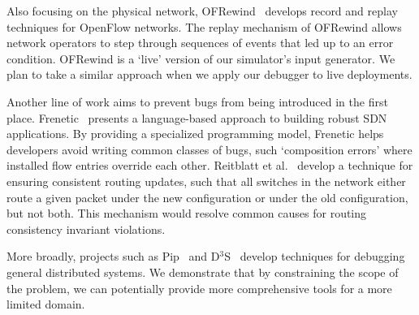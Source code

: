 
Also focusing on the physical network, OFRewind~\cite{ofrewind} develops
record and replay techniques
for OpenFlow networks. The replay
mechanism of OFRewind allows network operators to step through sequences of
events that led up to an error condition. OFRewind is a `live' version of our
simulator's input generator. We plan to take a similar approach when we apply
our debugger to live deployments. 

Another line of work aims to prevent bugs from being introduced in the first
place. Frenetic~\cite{frenetic} presents a language-based approach to building
robust SDN applications. By providing a specialized programming model, Frenetic helps developers avoid writing common classes of
bugs, such `composition errors' where installed flow entries override each other.
Reitblatt et al.~\cite{consistentupdates} develop a technique for ensuring
consistent routing updates, such that all switches in the network either route
a given packet under the new configuration or under the old configuration,
but not both. This mechanism would resolve common causes for routing consistency 
invariant violations.


More broadly, projects such as Pip~\cite{pip} and D$^3$S~\cite{d3s} develop
techniques for debugging general distributed systems. 
We demonstrate that by constraining the scope of the problem,
we can potentially provide more comprehensive tools for a more limited domain.






